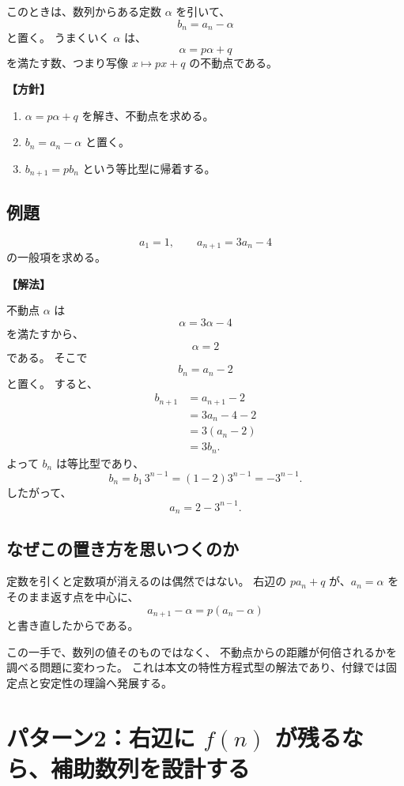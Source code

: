 このときは、数列からある定数 $\alpha$ を引いて、
\[
  b_n=a_n-\alpha
\]
と置く。
うまくいく $\alpha$ は、
\[
  \alpha=p\alpha+q
\]
を満たす数、つまり写像 $x\mapsto px+q$ の不動点である。

\noindent\textbf{【方針】}

\begin{enumerate}
  \item $\alpha=p\alpha+q$ を解き、不動点を求める。
  \item $b_n=a_n-\alpha$ と置く。
  \item $b_{n+1}=pb_n$ という等比型に帰着する。
\end{enumerate}

\subsection{例題}

\[
  a_1=1,\qquad a_{n+1}=3a_n-4
\]
の一般項を求める。

\noindent\textbf{【解法】}

不動点 $\alpha$ は
\[
  \alpha=3\alpha-4
\]
を満たすから、
\[
  \alpha=2
\]
である。
そこで
\[
  b_n=a_n-2
\]
と置く。
すると、
\[
  \begin{aligned}
    b_{n+1}
     & =a_{n+1}-2 \\
     & =3a_n-4-2  \\
     & =3(a_n-2)  \\
     & =3b_n.
  \end{aligned}
\]
よって $b_n$ は等比型であり、
\[
  b_n=b_1\,3^{n-1}=(1-2)3^{n-1}=-3^{n-1}.
\]
したがって、
\[
  \boxed{a_n=2-3^{n-1}}.
\]

\subsection{なぜこの置き方を思いつくのか}

定数を引くと定数項が消えるのは偶然ではない。
右辺の $pa_n+q$ が、$a_n=\alpha$ をそのまま返す点を中心に、
\[
  a_{n+1}-\alpha=p(a_n-\alpha)
\]
と書き直したからである。

この一手で、数列の値そのものではなく、
不動点からの距離が何倍されるかを調べる問題に変わった。
これは本文の特性方程式型の解法であり、付録では固定点と安定性の理論へ発展する。

\section{パターン2：右辺に $f(n)$ が残るなら、補助数列を設計する}

